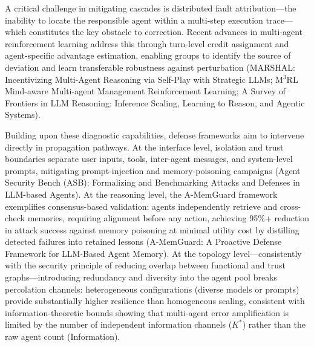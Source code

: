 \documentclass[11pt,a4paper]{article}
\begin{document}
A critical challenge in mitigating cascades is distributed fault attribution---the inability to locate the responsible agent within a multi-step execution trace---which constitutes the key obstacle to correction. Recent advances in multi-agent reinforcement learning address this through turn-level credit assignment and agent-specific advantage estimation, enabling groups to identify the source of deviation and learn transferable robustness against perturbation (MARSHAL: Incentivizing Multi-Agent Reasoning via Self-Play with Strategic LLMs; M$^{3}$RL Mind-aware Multi-agent Management Reinforcement Learning; A Survey of Frontiers in LLM Reasoning: Inference Scaling, Learning to Reason, and Agentic Systems).

Building upon these diagnostic capabilities, defense frameworks aim to intervene directly in propagation pathways. At the interface level, isolation and trust boundaries separate user inputs, tools, inter-agent messages, and system-level prompts, mitigating prompt-injection and memory-poisoning campaigns (Agent Security Bench (ASB): Formalizing and Benchmarking Attacks and Defenses in LLM-based Agents). At the reasoning level, the A-MemGuard framework exemplifies consensus-based validation: agents independently retrieve and cross-check memories, requiring alignment before any action, achieving 95\%+ reduction in attack success against memory poisoning at minimal utility cost by distilling detected failures into retained lessons (A-MemGuard: A Proactive Defense Framework for LLM-Based Agent Memory). At the topology level---consistently with the security principle of reducing overlap between functional and trust graphs---introducing redundancy and diversity into the agent pool breaks percolation channels: heterogeneous configurations (diverse models or prompts) provide substantially higher resilience than homogeneous scaling, consistent with information-theoretic bounds showing that multi-agent error amplification is limited by the number of independent information channels (\(K^*\)) rather than the raw agent count (Information).
\end{document}
